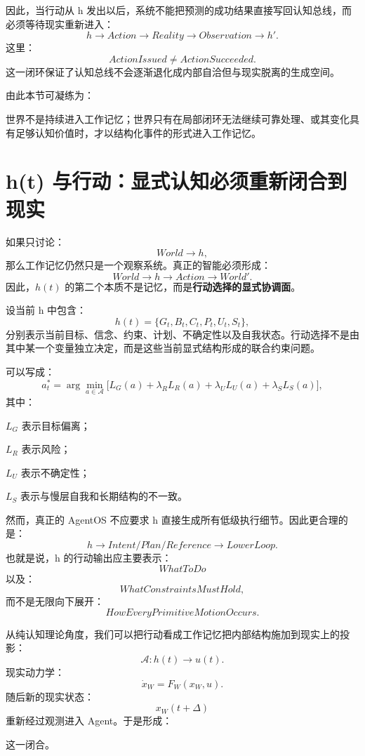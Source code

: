 因此，当行动从 h 发出以后，系统不能把预测的成功结果直接写回认知总线，而必须等待现实重新进入：
\[
h
\rightarrow
Action
\rightarrow
Reality
\rightarrow
Observation
\rightarrow
h'.
\]
这里：
\[
ActionIssued
\neq
ActionSucceeded.
\]
这一闭环保证了认知总线不会逐渐退化成内部自洽但与现实脱离的生成空间。

由此本节可凝练为：
\begin{statementbox}
世界不是持续进入工作记忆；世界只有在局部闭环无法继续可靠处理、或其变化具有足够认知价值时，才以结构化事件的形式进入工作记忆。
\end{statementbox}

\section{h(t) 与行动：显式认知必须重新闭合到现实}

如果只讨论：
\[
World\rightarrow h,
\]
那么工作记忆仍然只是一个观察系统。真正的智能必须形成：
\[
World
\rightarrow
h
\rightarrow
Action
\rightarrow
World'.
\]
因此，$h(t)$ 的第二个本质不是记忆，而是\textbf{行动选择的显式协调面}。

设当前 h 中包含：
\[
h(t)=
\{
G_t,
B_t,
C_t,
P_t,
U_t,
S_t
\},
\]
分别表示当前目标、信念、约束、计划、不确定性以及自我状态。行动选择不是由其中某一个变量独立决定，而是这些当前显式结构形成的联合约束问题。

可以写成：
\[
a_t^*
=
\arg\min_{a\in\mathcal A}
\Big[
L_G(a)
+
\lambda_RL_R(a)
+
\lambda_UL_U(a)
+
\lambda_SL_S(a)
\Big],
\]
其中：

$L_G$ 表示目标偏离；

$L_R$ 表示风险；

$L_U$ 表示不确定性；

$L_S$ 表示与慢层自我和长期结构的不一致。

然而，真正的 AgentOS 不应要求 h 直接生成所有低级执行细节。因此更合理的是：
\[
h
\rightarrow
Intent/Plan/Reference
\rightarrow
LowerLoop.
\]
也就是说，h 的行动输出应主要表示：
\[
WhatToDo
\]
以及：
\[
WhatConstraintsMustHold,
\]
而不是无限向下展开：
\[
HowEveryPrimitiveMotionOccurs.
\]

从纯认知理论角度，我们可以把行动看成工作记忆把内部结构施加到现实上的投影：
\[
\mathcal A:
h(t)
\rightarrow
u(t).
\]
现实动力学：
\[
\dot x_W
=
F_W(x_W,u).
\]
随后新的现实状态：
\[
x_W(t+\Delta)
\]
重新经过观测进入 Agent。于是形成：
\begin{statementbox}
\centering
{}
\end{statementbox}
这一闭合。

